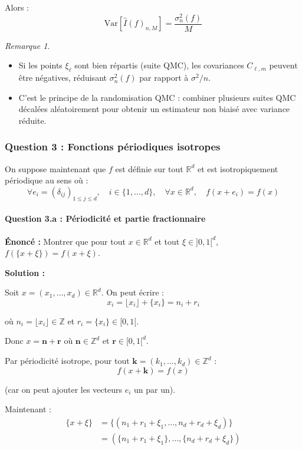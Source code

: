 \documentclass[12pt,a4paper]{article}
\theoremstyle{definition}
\theoremstyle{remark}
\newtheorem*{remark}{Remarque}
\newcommand{\R}{\mathbb{R}}
\newcommand{\Var}{\text{Var}}
\begin{document}
Alors :
\[
\boxed{\Var[\hat{I}(f)_{n,M}] = \frac{\sigma_n^2(f)}{M}}
\]

\begin{remark}
\begin{itemize}
\item Si les points $\xi_\ell$ sont bien répartis (suite QMC), les covariances $C_{\ell,m}$ peuvent être négatives, réduisant $\sigma_n^2(f)$ par rapport à $\sigma^2/n$.
\item C'est le principe de la randomisation QMC : combiner plusieurs suites QMC décalées aléatoirement pour obtenir un estimateur non biaisé avec variance réduite.
\end{itemize}
\end{remark}

\subsubsection{Question 3 : Fonctions périodiques isotropes}

On suppose maintenant que $f$ est définie sur tout $\R^d$ et est isotropiquement périodique au sens où :
\[
\forall e_i = (\delta_{ij})_{1 \leq j \leq d}, \quad i \in \{1,\ldots,d\}, \quad \forall x \in \R^d, \quad f(x + e_i) = f(x)
\]

\paragraph{Question 3.a : Périodicité et partie fractionnaire}

\textbf{Énoncé :} Montrer que pour tout $x \in \R^d$ et tout $\xi \in ]0,1[^d$, $f(\{x + \xi\}) = f(x + \xi)$.

\textbf{Solution :}

Soit $x = (x_1, \ldots, x_d) \in \R^d$. On peut écrire :
\[
x_i = \lfloor x_i \rfloor + \{x_i\} = n_i + r_i
\]

où $n_i = \lfloor x_i \rfloor \in \mathbb{Z}$ et $r_i = \{x_i\} \in [0,1[$.

Donc $x = \mathbf{n} + \mathbf{r}$ où $\mathbf{n} \in \mathbb{Z}^d$ et $\mathbf{r} \in [0,1[^d$.

Par périodicité isotrope, pour tout $\mathbf{k} = (k_1, \ldots, k_d) \in \mathbb{Z}^d$ :
\[
f(x + \mathbf{k}) = f(x)
\]

(car on peut ajouter les vecteurs $e_i$ un par un).

Maintenant :
\begin{align*}
\{x + \xi\} &= \{(n_1 + r_1 + \xi_1, \ldots, n_d + r_d + \xi_d)\} \\
&= (\{n_1 + r_1 + \xi_1\}, \ldots, \{n_d + r_d + \xi_d\})
\end{align*}
\end{document}
